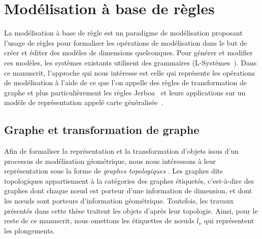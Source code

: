 \section[Modélisation à base de règles]{Modélisation à base de règles}
\label{sec:etat-art-model-regles}

La modélisation à base de règle est un paradigme de modélisation proposant
l'usage de règles pour formaliser les opérations de modélisation dans le but de
créer et éditer des modèles de dimensions quelconques. %
Pour générer et modifier ces modèles, les systèmes existants utilisent des grammaires
(L-Systèmes~\cite{lindenmayer1974adding,bohl2015modeling,terraz20093gmap}). %
Dans ce manuscrit, l'approche qui nous intéresse est celle qui représente les
opérations de modélisation à l'aide de ce que l'on appelle des règles de
transformation de graphe et plus particulièrement les règles
Jerboa~\cite{belhaouari2014jerboa} et leurs applications sur un modèle de
représentation appelé carte
généralisée~\cite{lienhardt1994n,Damiand-Lienhardt14}. %

\subsection[Graphe et transformation de graphe]{Graphe et transformation de graphe}
\label{sec:etat-art-model-regles-graphe-et-transfo}

%
Afin de formaliser la représentation et la transformation d'objets issus d'un
processus de modélisation géométrique, nous nous intéressons à leur
représentation sous la forme de \emph{graphes
	topologiques}%
. %
Les graphes dits topologiques appartiennent à la catégories des graphes
étiquetés, c'est-à-dire des graphes dont chaque n\oe ud est porteur d'une
information de dimension, et dont les n\oe uds sont porteurs d'information
géométrique. %
Toutefois, les travaux présentés dans cette thèse traitent les objets d'après
leur topologie. %
Ainsi, pour le reste de ce manuscrit, nous omettons les étiquettes de n\oe uds \(l_{v}\)
qui représentent les plongements.

